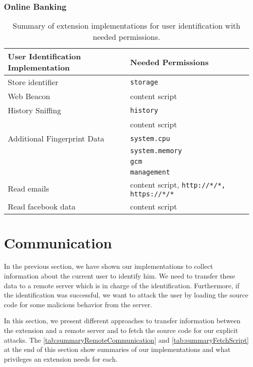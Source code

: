 \subsubsection{Online Banking}



	\begin{table}
		\centering
		\begin{tabular}{|l|l|} \hline 
			\textbf{User Identification Implementation} & \textbf{Needed Permissions} \\ \hline
			Store identifier & \texttt{storage} \\
			\hline
			Web Beacon & content script \\
			\hline
			History Sniffing & \texttt{history} \\
			& content script \\
			\hline
			Additional Fingerprint Data & \texttt{system.cpu} \\
			& \texttt{system.memory} \\
			& \texttt{gcm} \\
			& \texttt{management} \\
			\hline
			Read emails & content script, \texttt{http://*/*, https://*/*} \\
			Read facebook data & content script \\
			\hline
		\end{tabular}
		\caption{Summary of extension implementations for user identification with needed permissions.}
		\label{tab:summaryUserIdentification}
	\end{table}

	
	
	
	
\clearpage
\section{Communication}
\label{sec:communication}

	In the previous section, we have shown our implementations to collect information about the current user to identify him. We need to transfer these data to a remote server which is in charge of the identification. Furthermore, if the identification was successful, we want to attack the user by loading the source code for some malicious behavior from the server.
	
	In this section, we present different approaches to transfer information between the extension and a remote server and to fetch the source code for our explicit attacks. The \autoref{tab:summaryRemoteCommunication} and \autoref{tab:summaryFetchScript} at the end of this section show summaries of our implementations and what privileges an extension needs for each.
	
